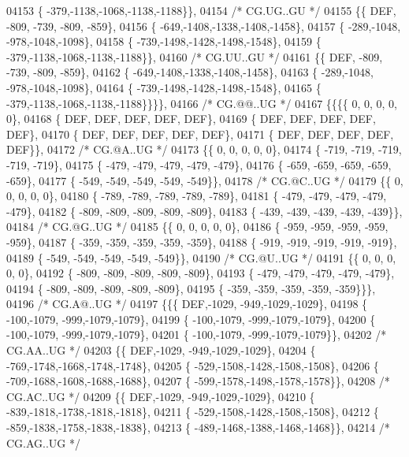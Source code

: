 \begin{DoxyCode}
04153 \{ -379,-1138,-1068,-1138,-1188\}\},
04154 \textcolor{comment}{/* CG.UG..GU */}
04155 \{\{  DEF, -809, -739, -809, -859\},
04156 \{ -649,-1408,-1338,-1408,-1458\},
04157 \{ -289,-1048, -978,-1048,-1098\},
04158 \{ -739,-1498,-1428,-1498,-1548\},
04159 \{ -379,-1138,-1068,-1138,-1188\}\},
04160 \textcolor{comment}{/* CG.UU..GU */}
04161 \{\{  DEF, -809, -739, -809, -859\},
04162 \{ -649,-1408,-1338,-1408,-1458\},
04163 \{ -289,-1048, -978,-1048,-1098\},
04164 \{ -739,-1498,-1428,-1498,-1548\},
04165 \{ -379,-1138,-1068,-1138,-1188\}\}\}\},
04166 \textcolor{comment}{/* CG.@@..UG */}
04167 \{\{\{\{    0,    0,    0,    0,    0\},
04168 \{  DEF,  DEF,  DEF,  DEF,  DEF\},
04169 \{  DEF,  DEF,  DEF,  DEF,  DEF\},
04170 \{  DEF,  DEF,  DEF,  DEF,  DEF\},
04171 \{  DEF,  DEF,  DEF,  DEF,  DEF\}\},
04172 \textcolor{comment}{/* CG.@A..UG */}
04173 \{\{    0,    0,    0,    0,    0\},
04174 \{ -719, -719, -719, -719, -719\},
04175 \{ -479, -479, -479, -479, -479\},
04176 \{ -659, -659, -659, -659, -659\},
04177 \{ -549, -549, -549, -549, -549\}\},
04178 \textcolor{comment}{/* CG.@C..UG */}
04179 \{\{    0,    0,    0,    0,    0\},
04180 \{ -789, -789, -789, -789, -789\},
04181 \{ -479, -479, -479, -479, -479\},
04182 \{ -809, -809, -809, -809, -809\},
04183 \{ -439, -439, -439, -439, -439\}\},
04184 \textcolor{comment}{/* CG.@G..UG */}
04185 \{\{    0,    0,    0,    0,    0\},
04186 \{ -959, -959, -959, -959, -959\},
04187 \{ -359, -359, -359, -359, -359\},
04188 \{ -919, -919, -919, -919, -919\},
04189 \{ -549, -549, -549, -549, -549\}\},
04190 \textcolor{comment}{/* CG.@U..UG */}
04191 \{\{    0,    0,    0,    0,    0\},
04192 \{ -809, -809, -809, -809, -809\},
04193 \{ -479, -479, -479, -479, -479\},
04194 \{ -809, -809, -809, -809, -809\},
04195 \{ -359, -359, -359, -359, -359\}\}\},
04196 \textcolor{comment}{/* CG.A@..UG */}
04197 \{\{\{  DEF,-1029, -949,-1029,-1029\},
04198 \{ -100,-1079, -999,-1079,-1079\},
04199 \{ -100,-1079, -999,-1079,-1079\},
04200 \{ -100,-1079, -999,-1079,-1079\},
04201 \{ -100,-1079, -999,-1079,-1079\}\},
04202 \textcolor{comment}{/* CG.AA..UG */}
04203 \{\{  DEF,-1029, -949,-1029,-1029\},
04204 \{ -769,-1748,-1668,-1748,-1748\},
04205 \{ -529,-1508,-1428,-1508,-1508\},
04206 \{ -709,-1688,-1608,-1688,-1688\},
04207 \{ -599,-1578,-1498,-1578,-1578\}\},
04208 \textcolor{comment}{/* CG.AC..UG */}
04209 \{\{  DEF,-1029, -949,-1029,-1029\},
04210 \{ -839,-1818,-1738,-1818,-1818\},
04211 \{ -529,-1508,-1428,-1508,-1508\},
04212 \{ -859,-1838,-1758,-1838,-1838\},
04213 \{ -489,-1468,-1388,-1468,-1468\}\},
04214 \textcolor{comment}{/* CG.AG..UG */}

\end{DoxyCode}
